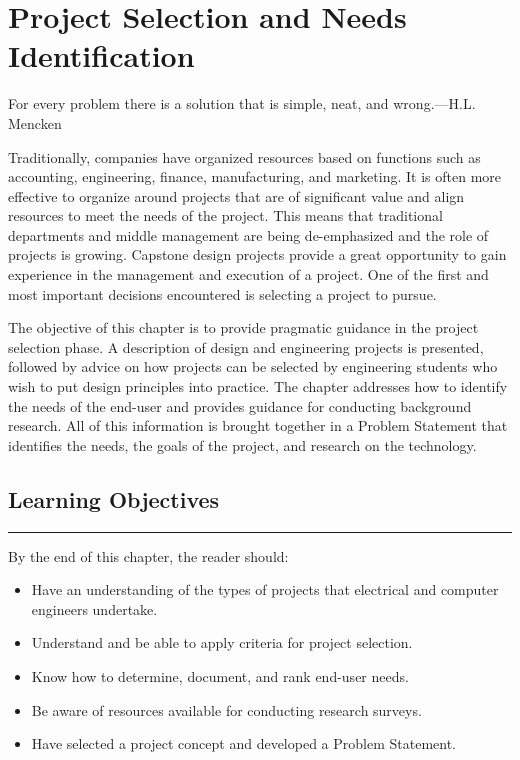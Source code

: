 \chapter{Project Selection and Needs Identification}
\label{chapter:projectSelection}
\graphicspath{ {./chapter02/Fig} }

\begin{itquote}
For every problem there is a solution that is simple, neat, and
wrong.---H.L. Mencken
\end{itquote}

Traditionally, companies have organized resources based on functions
such as accounting, engineering, finance, manufacturing, and marketing.
It is often more effective to organize around projects that are of
significant value and align resources to meet the needs of the project.
This means that traditional departments and middle management are being
de-emphasized and the role of projects is growing. Capstone design
projects provide a great opportunity to gain experience in the
management and execution of a project. One of the first and most
important decisions encountered is selecting a project to pursue.

The objective of this chapter is to provide pragmatic guidance in the
project selection phase. A description of design and engineering
projects is presented, followed by advice on how projects can be
selected by engineering students who wish to put design principles into
practice. The chapter addresses how to identify the needs of the
end-user and provides guidance for conducting background research. All
of this information is brought together in a Problem Statement that
identifies the needs, the goals of the project, and research on the
technology.

\section*{Learning Objectives}
\noindent\rule{\linewidth}{1pt}
By the end of this chapter, the reader should:
\begin{itemize}
\item
  Have an understanding of the types of projects that electrical and
  computer engineers undertake.
\item
  Understand and be able to apply criteria for project selection.
\item
  Know how to determine, document, and rank end-user needs.
\item
  Be aware of resources available for conducting research surveys.
\item
  Have selected a project concept and developed a Problem Statement.
\end{itemize}

